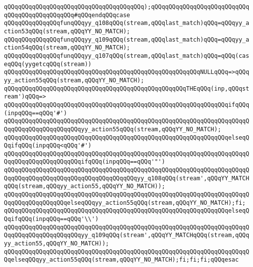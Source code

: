 \verb|qQQqqQQqqQQqqQQqqQQqqQQqqQQqqQQqqQQqqQQq);qQQqqQQqqQQqqQQqqQQqqQQqqQQqqQQqqQQqqQQqqQQqqQQq#qQQqendqQQqcase|\newline
\verb|qQQqqQQqqQQqqQQqfunqQQqyy_q108qQQq(stream,qQQqlast_match)qQQq=qQQqyy_action53qQQq(stream,qQQqYY_NO_MATCH);|\newline
\verb|qQQqqQQqqQQqqQQqfunqQQqyy_q109qQQq(stream,qQQqlast_match)qQQq=qQQqyy_action54qQQq(stream,qQQqYY_NO_MATCH);|\newline
\verb|qQQqqQQqqQQqqQQqfunqQQqyy_q107qQQq(stream,qQQqlast_match)qQQq=qQQq(caseqQQq(yygetcqQQq(stream))|\newline
\verb|qQQqqQQqqQQqqQQqqQQqqQQqqQQqqQQqqQQqqQQqqQQqqQQqqQQqqQQqNULLqQQq=>qQQqyy_action55qQQq(stream,qQQqYY_NO_MATCH);|\newline
\verb|qQQqqQQqqQQqqQQqqQQqqQQqqQQqqQQqqQQqqQQqqQQqqQQqqQQqTHEqQQq(inp,qQQqstream')qQQq=>|\newline
\verb|qQQqqQQqqQQqqQQqqQQqqQQqqQQqqQQqqQQqqQQqqQQqqQQqqQQqqQQqqQQqqQQqifqQQq(inpqQQq==qQQq'#')|\newline
\verb|qQQqqQQqqQQqqQQqqQQqqQQqqQQqqQQqqQQqqQQqqQQqqQQqqQQqqQQqqQQqqQQqqQQqqQQqqQQqqQQqqQQqqQQqqQQqyy_action55qQQq(stream,qQQqYY_NO_MATCH);|\newline
\verb|qQQqqQQqqQQqqQQqqQQqqQQqqQQqqQQqqQQqqQQqqQQqqQQqqQQqqQQqqQQqqQQqelseqQQqifqQQq(inpqQQq<qQQq'#')|\newline
\verb|qQQqqQQqqQQqqQQqqQQqqQQqqQQqqQQqqQQqqQQqqQQqqQQqqQQqqQQqqQQqqQQqqQQqqQQqqQQqqQQqqQQqqQQqqQQqifqQQq(inpqQQq==qQQq'"')|\newline
\verb|qQQqqQQqqQQqqQQqqQQqqQQqqQQqqQQqqQQqqQQqqQQqqQQqqQQqqQQqqQQqqQQqqQQqqQQqqQQqqQQqqQQqqQQqqQQqqQQqqQQqqQQqqQQqyy_q108qQQq(stream',qQQqYY_MATCHqQQq(stream,qQQqyy_action55,qQQqYY_NO_MATCH));|\newline
\verb|qQQqqQQqqQQqqQQqqQQqqQQqqQQqqQQqqQQqqQQqqQQqqQQqqQQqqQQqqQQqqQQqqQQqqQQqqQQqqQQqqQQqqQQqelseqQQqyy_action55qQQq(stream,qQQqYY_NO_MATCH);fi;|\newline
\verb|qQQqqQQqqQQqqQQqqQQqqQQqqQQqqQQqqQQqqQQqqQQqqQQqqQQqqQQqqQQqqQQqelseqQQqifqQQq(inpqQQq==qQQq'\\')|\newline
\verb|qQQqqQQqqQQqqQQqqQQqqQQqqQQqqQQqqQQqqQQqqQQqqQQqqQQqqQQqqQQqqQQqqQQqqQQqqQQqqQQqqQQqqQQqqQQqyy_q109qQQq(stream',qQQqYY_MATCHqQQq(stream,qQQqyy_action55,qQQqYY_NO_MATCH));|\newline
\verb|qQQqqQQqqQQqqQQqqQQqqQQqqQQqqQQqqQQqqQQqqQQqqQQqqQQqqQQqqQQqqQQqqQQqqQQqelseqQQqyy_action55qQQq(stream,qQQqYY_NO_MATCH);fi;fi;fi;qQQqesac|\newline
